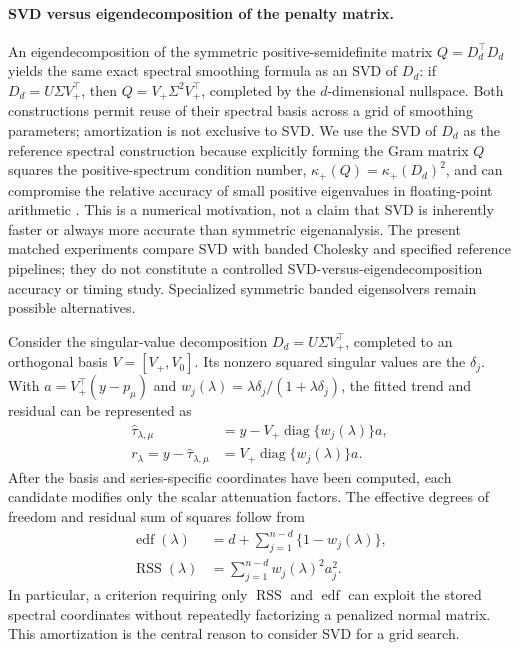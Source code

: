 \paragraph{SVD versus eigendecomposition of the penalty matrix.}
An eigendecomposition of the symmetric positive-semidefinite matrix
$Q=D_d^\top D_d$ yields the same exact spectral smoothing formula as
an SVD of $D_d$: if $D_d=U\Sigma V_+^\top$, then
$Q=V_+\Sigma^2V_+^\top$, completed by the $d$-dimensional nullspace.
Both constructions permit reuse of their spectral basis across a grid
of smoothing parameters; amortization is not exclusive to SVD.
We use the SVD of $D_d$ as the reference spectral construction because
explicitly forming the Gram matrix $Q$ squares the positive-spectrum
condition number,
$\kappa_+(Q)=\kappa_+(D_d)^2$, and can compromise the relative accuracy
of small positive eigenvalues in floating-point arithmetic
\citep{golub2013matrix}. This is a numerical motivation, not a claim
that SVD is inherently faster or always more accurate than symmetric
eigenanalysis. The present matched experiments compare SVD with banded
Cholesky and specified reference pipelines; they do not constitute a
controlled SVD-versus-eigendecomposition accuracy or timing study.
Specialized symmetric banded eigensolvers remain possible alternatives.

Consider the singular-value decomposition $D_d=U\Sigma V_+^\top$, completed to an orthogonal basis $V=[V_+,V_0]$. Its nonzero squared singular values are the $\delta_j$. With
$a=V_+^\top(y-p_\mu)$ and
$w_j(\lambda)=\lambda\delta_j/(1+\lambda\delta_j)$, the fitted trend and residual can be represented as
\begin{align}
\widehat{\tau}_{\lambda,\mu}
&=y-V_+\operatorname{diag}\{w_j(\lambda)\}a,
\label{eq:spectraltrend}\\
r_\lambda=y-\widehat{\tau}_{\lambda,\mu}
&=V_+\operatorname{diag}\{w_j(\lambda)\}a.
\label{eq:spectralresidual}
\end{align}
After the basis and series-specific coordinates have been computed, each candidate modifies only the scalar attenuation factors. The effective degrees of freedom and residual sum of squares follow from
\begin{align}
\operatorname{edf}(\lambda)
&=d+\sum_{j=1}^{n-d}\{1-w_j(\lambda)\},
\label{eq:edf}\\
\operatorname{RSS}(\lambda)
&=\sum_{j=1}^{n-d}w_j(\lambda)^2a_j^2.
\label{eq:rss}
\end{align}
In particular, a criterion requiring only $\operatorname{RSS}$ and $\operatorname{edf}$ can exploit the stored spectral coordinates without repeatedly factorizing a penalized normal matrix. This amortization is the central reason to consider SVD for a grid search.


